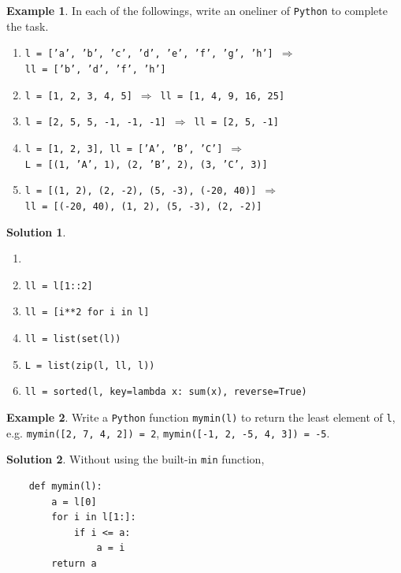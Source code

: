 \documentclass[11pt]{extarticle}
\newcommand{\ie}{\,\Longrightarrow\,}
\theoremstyle{definition}
\newtheorem*{ex}{Example}
\newtheorem*{sol}{Solution}
\begin{document}
\newpage

\begin{ex}
  In each of the followings, write an oneliner of {\tt Python} to complete the task. 
  \begin{enumerate}
    \item {\tt l = ['a', 'b', 'c', 'd', 'e', 'f', 'g', 'h']} $\ie$ \\ {\tt ll = ['b', 'd', 'f', 'h']}
    \item {\tt l = [1, 2, 3, 4, 5]} $\ie$ {\tt ll = [1, 4, 9, 16, 25]}
    \item {\tt l = [2, 5, 5, -1, -1, -1]} $\ie$ {\tt ll = [2, 5, -1]}
    \item {\tt l = [1, 2, 3], ll = ['A', 'B', 'C']} $\ie$ \\{\tt L = [(1, 'A', 1), (2, 'B', 2), (3, 'C', 3)]}
    \item {\tt l = [(1, 2), (2, -2), (5, -3), (-20, 40)]} $\ie$ \\ {\tt ll = [(-20, 40), (1, 2), (5, -3), (2, -2)]}
  \end{enumerate}
\end{ex}
 
\newpage

\begin{sol}
  \begin{enumerate}[label=(\alph*)]
    \item[]
    \item {\tt ll = l[1::2]}
    \item {\tt ll = [i**2 for i in l]}
    \item {\tt ll = list(set(l))}
    \item {\tt L = list(zip(l, ll, l))}
    \item {\tt ll = sorted(l, key=lambda x: sum(x), reverse=True)}
  \end{enumerate}
\end{sol}

\newpage

\begin{ex} 
  Write a {\tt Python} function {\tt mymin(l)} to return the least element of {\tt l}, e.g. {\tt mymin([2, 7, 4, 2]) = 2}, {\tt mymin([-1, 2, -5, 4, 3]) = -5}.
\end{ex}

\begin{sol} Without using the built-in {\tt min} function, \\
  \begin{verbatim}
    def mymin(l):
        a = l[0]
        for i in l[1:]:
            if i <= a:
                a = i
        return a
  \end{verbatim}
\end{sol}
\end{document}
